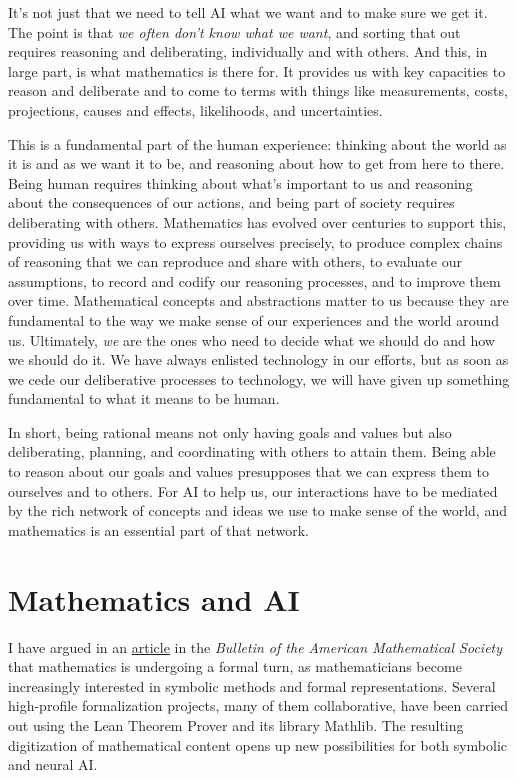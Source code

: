\documentclass[11pt]{article}
\begin{document}
It's not just that we need to tell AI what we want and to make sure we get it. The point is that \emph{we often don't know what we want}, and sorting that out requires reasoning and deliberating, individually and with others. And this, in large part, is what mathematics is there for. It provides us with key capacities to reason and deliberate and to come to terms with things like measurements, costs, projections, causes and effects, likelihoods, and uncertainties.

This is a fundamental part of the human experience: thinking about the world as it is and as we want it to be, and reasoning about how to get from here to there. Being human requires thinking about what's important to us and reasoning about the consequences of our actions, and being part of society requires deliberating with others. Mathematics has evolved over centuries to support this, providing us with ways to express ourselves precisely, to produce complex chains of reasoning that we can reproduce and share with others, to evaluate our assumptions, to record and codify our reasoning processes, and to improve them over time. Mathematical concepts and abstractions matter to us because they are fundamental to the way we make sense of our experiences and the world around us. Ultimately, \emph{we} are the ones who need to decide what we should do and how we should do it. We have always enlisted technology in our efforts, but as soon as we cede our deliberative processes to technology, we will have given up something fundamental to what it means to be human.

In short, being rational means not only having goals and values but also deliberating, planning, and coordinating with others to attain them. Being able to reason about our goals and values presupposes that we can express them to ourselves and to others. For AI to help us, our interactions have to be mediated by the rich network of concepts and ideas we use to make sense of the world, and mathematics is an essential part of that network.

\section{Mathematics and AI}

I have argued in an \href{https://www.ams.org/journals/bull/2024-61-02/S0273-0979-2024-01832-1/}{article} in the \emph{Bulletin of the American Mathematical Society} that mathematics is undergoing a formal turn, as mathematicians become increasingly interested in symbolic methods and formal representations. Several high-profile formalization projects, many of them collaborative, have been carried out using the Lean Theorem Prover and its library Mathlib. The resulting digitization of mathematical content opens up new possibilities for both symbolic and neural AI.
\end{document}
